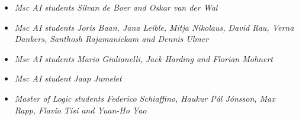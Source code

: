 {{{{{{{{{
{\begin{itemize}
  \item[] \textit{Msc AI students Silvan de Boer and Oskar van der Wal}
\end{itemize}}}

{
{\begin{itemize}
  \item[] \textit{Msc AI students Joris Baan, Jana Leible, Mitja Nikolaus, David Rau, Verna Dankers, Santhosh Rajamanickam and Dennis Ulmer}
\end{itemize}}}

{
{\begin{itemize}
  \item[] \textit{Msc AI students Mario Giulianelli, Jack Harding and Florian Mohnert}
\end{itemize}}}

{
{\begin{itemize}
  \item[] \textit{Msc AI student Jaap Jumelet}
\end{itemize}}}


{
{\begin{itemize}
  \item[] \textit{Master of Logic students Federico Schiaffino, Haukur Pál Jónsson, Max Rapp, Flavio Tisi and Yuan-Ho Yao}
\end{itemize}}}

}}}}}}}}
